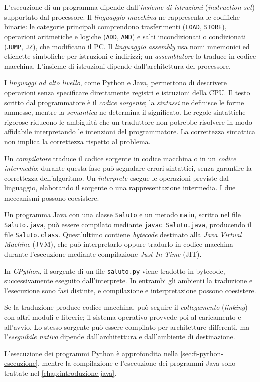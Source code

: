 L'esecuzione di un programma dipende dall'\emph{insieme di istruzioni}
(\emph{instruction set}) supportato dal processore. Il
\emph{linguaggio macchina} ne rappresenta le codifiche binarie:
le categorie principali comprendono trasferimenti (\texttt{LOAD},
\texttt{STORE}), operazioni aritmetiche e logiche (\texttt{ADD},
\texttt{AND}) e salti incondizionati o condizionati
(\texttt{JUMP}, \texttt{JZ}), che modificano il PC.
Il \emph{linguaggio assembly} usa nomi mnemonici ed etichette
simboliche per istruzioni e indirizzi; un \emph{assemblatore} lo
traduce in codice macchina. L'insieme di istruzioni dipende
dall'architettura del processore.

I \emph{linguaggi ad alto livello}, come Python e Java, permettono
di descrivere operazioni senza specificare direttamente registri
e istruzioni della CPU. Il testo scritto dal programmatore è il
\emph{codice sorgente}; la \emph{sintassi} ne definisce le forme
ammesse, mentre la \emph{semantica} ne determina il significato.
Le regole sintattiche rigorose riducono le ambiguità che un traduttore
non potrebbe risolvere in modo affidabile interpretando le intenzioni
del programmatore. La correttezza sintattica non implica la
correttezza rispetto al problema.

Un \emph{compilatore} traduce il codice sorgente in codice macchina
o in un \emph{codice intermedio}; durante questa fase può segnalare
errori sintattici, senza garantire la correttezza dell'algoritmo.
Un \emph{interprete} esegue le operazioni previste dal linguaggio,
elaborando il sorgente o una rappresentazione intermedia.
I due meccanismi possono coesistere.

\begin{example}
Un programma Java con una classe \texttt{Saluto} e un metodo
\texttt{main}, scritto nel file \texttt{Saluto.java}, può essere
compilato mediante \texttt{javac Saluto.java}, producendo il file
\texttt{Saluto.class}.
Quest'ultimo contiene \emph{bytecode} destinato alla
\emph{Java Virtual Machine} (JVM), che può interpretarlo oppure
tradurlo in codice macchina durante l'esecuzione mediante compilazione
\emph{Just-In-Time} (JIT).

In \emph{CPython}, il sorgente di un file \texttt{saluto.py}
viene tradotto in bytecode, successivamente eseguito dall'interprete.
In entrambi gli ambienti la traduzione e l'esecuzione sono fasi
distinte, e compilazione e interpretazione possono coesistere.
\end{example}

Se la traduzione produce codice macchina, può seguire il
\emph{collegamento} (\emph{linking}) con altri moduli e librerie;
il sistema operativo provvede poi al caricamento e all'avvio.
Lo stesso sorgente può essere compilato per architetture differenti,
ma l'\emph{eseguibile nativo} dipende dall'architettura e
dall'ambiente di destinazione.

L'esecuzione dei programmi Python è approfondita nella
\cref{sec:fi-python-esecuzione}, mentre la compilazione e
l'esecuzione dei programmi Java sono trattate nel
\cref{chap:introduzione-java}.
